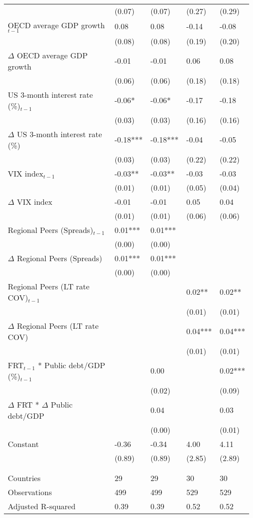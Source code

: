\begin{tabular}{lp{3cm}p{3cm}p{3cm}p{3cm}}
   & (0.07) & (0.07) & (0.27) & (0.29) \\ 
  OECD average GDP growth$_{t-1}$ & 0.08 & 0.08 & -0.14 & -0.08 \\ 
   & (0.08) & (0.08) & (0.19) & (0.20) \\ 
  $\Delta$ OECD average GDP growth & -0.01 & -0.01 & 0.06 & 0.08 \\ 
   & (0.06) & (0.06) & (0.18) & (0.18) \\ 
  US 3-month interest rate (\%)$_{t-1}$ & -0.06* & -0.06* & -0.17 & -0.18 \\ 
   & (0.03) & (0.03) & (0.16) & (0.16) \\ 
  $\Delta$ US 3-month interest rate (\%) & -0.18*** & -0.18*** & -0.04 & -0.05 \\ 
   & (0.03) & (0.03) & (0.22) & (0.22) \\ 
  VIX index$_{t-1}$ & -0.03** & -0.03** & -0.03 & -0.03 \\ 
   & (0.01) & (0.01) & (0.05) & (0.04) \\ 
  $\Delta$ VIX index & -0.01 & -0.01 & 0.05 & 0.04 \\ 
   & (0.01) & (0.01) & (0.06) & (0.06) \\ 
  Regional Peers (Spreads)$_{t-1}$ & 0.01*** & 0.01*** &  &  \\ 
   & (0.00) & (0.00) &  &  \\ 
  $\Delta$ Regional Peers (Spreads) & 0.01*** & 0.01*** &  &  \\ 
   & (0.00) & (0.00) &  &  \\ 
  Regional Peers (LT rate COV)$_{t-1}$ &  &  & 0.02** & 0.02** \\ 
   &  &  & (0.01) & (0.01) \\ 
  $\Delta$ Regional Peers (LT rate COV) &  &  & 0.04*** & 0.04*** \\ 
   &  &  & (0.01) & (0.01) \\ 
  FRT$_{t-1}$ * Public debt/GDP (\%)$_{t-1}$ &  & 0.00 &  & 0.02*** \\ 
   &  & (0.02) &  & (0.09) \\ 
  $\Delta$ FRT * $\Delta$ Public debt/GDP &  & 0.04 &  & 0.03 \\ 
   &  & (0.00) &  & (0.01) \\ 
  Constant & -0.36 & -0.34 & 4.00 & 4.11 \\ 
   & (0.89) & (0.89) & (2.85) & (2.89) \\ 
   &  &  &  &  \\ 
   &  &  &  &  \\ 
  Countries & 29 & 29 & 30 & 30 \\ 
  Observations & 499 & 499 & 529 & 529 \\ 
  Adjusted R-squared & 0.39 & 0.39 & 0.52 & 0.52 \\ 
   \hline
\end{tabular}
\endgroup
